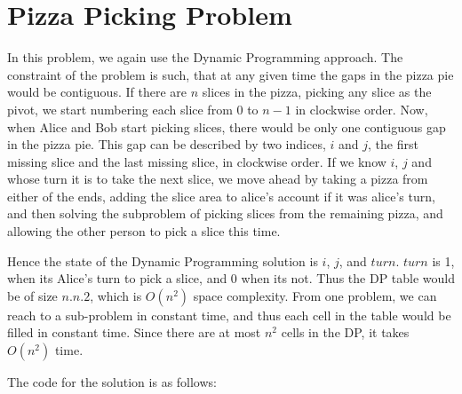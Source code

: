 \documentclass{article}
\begin{document}
\section{Pizza Picking Problem}
In this problem, we again use the Dynamic Programming approach. The constraint of the problem is such, that at any given time the gaps in the pizza pie would be contiguous. If there are $n$ slices in the pizza, picking any slice as the pivot, we start numbering each slice from $0$ to $n-1$ in clockwise order. Now, when Alice and Bob start picking slices, there would be only one contiguous gap in the pizza pie. This gap can be described by two indices, $i$ and $j$, the first missing slice and the last missing slice, in clockwise order. If we know $i$, $j$ and whose turn it is to take the next slice, we move ahead by taking a pizza from either of the ends, adding the slice area to alice's account if it was alice's turn, and then solving the subproblem of picking slices from the remaining pizza, and allowing the other person to pick a slice this time. 

Hence the state of the Dynamic Programming solution is $i$, $j$, and $turn$. $turn$ is 1, when its Alice's turn to pick a slice, and 0 when its not. Thus the DP table would be of size $n.n.2$, which is $O(n^2)$ space complexity. From one problem, we can reach to a sub-problem in constant time, and thus each cell in the table would be filled in constant time. Since there are at most $n^2$ cells in the DP, it takes $O(n^2)$ time.

The code for the solution is as follows:

\end{document}
